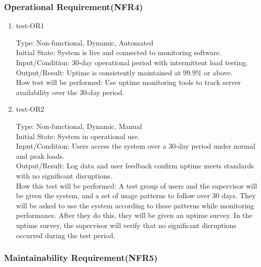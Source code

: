 \documentclass[12pt, titlepage]{article}
\begin{document}
\subsubsection{Operational Requirement(NFR4)} \label{section:4.2.4}

\begin{enumerate}
    \item{test-OR1\\} \label{test-OR1}
    
    Type: Non-functional, Dynamic, Automated\\
    
    Initial State: System is live and connected to monitoring software.\\
    
    Input/Condition: 30-day operational period with intermittent load testing.\\
    
    Output/Result: Uptime is consistently maintained at 99.9\% or above.\\
    
    How test will be performed: Use uptime monitoring tools to track server availability over the 30-day period.

    \item{test-OR2\\} \label{test-OR2}
    
    Type: Non-functional, Dynamic, Manual\\
    
    Initial State: System in operational use.\\
    
    Input/Condition: Users access the system over a 30-day period under normal and peak loads.\\
    
    Output/Result: Log data and user feedback confirm uptime meets standards with no significant disruptions.\\
    
    How this test will be performed: A test group of users and the supervisor will be given the system, and a set of usage patterns to follow over 30 days. They will be asked to use the system according to these patterns while monitoring performance. After they do this, they will be given an uptime survey. In the uptime survey, the supervisor will verify that no significant disruptions occurred during the test period.
\end{enumerate}

\subsubsection{Maintainability Requirement(NFR5)} \label{section:4.2.5}
\end{document}
